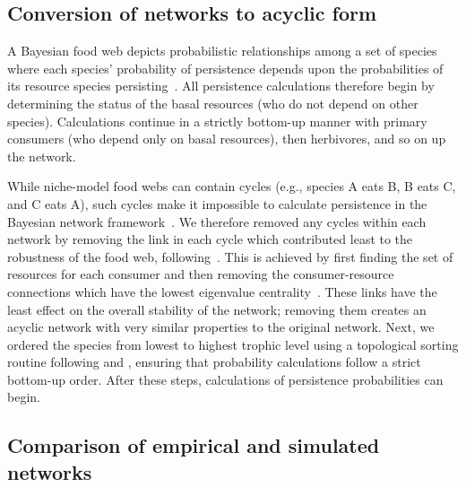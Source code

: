 \documentclass[12pt]{article}
\begin{document}
\begin{spacing}{2.0}
    

    \subsection{Conversion of networks to acyclic form}

        A Bayesian food web depicts probabilistic relationships among a set of species where each species' probability of persistence depends upon the probabilities of its resource species persisting~\citep{Jensen_Nielsen,Eklof2013}. 
        All persistence calculations therefore begin by determining the status of the basal resources (who do not depend on other species).
        Calculations continue in a strictly bottom-up manner with primary consumers (who depend only on basal resources), then herbivores, and so on up the network.

            
        While niche-model food webs can contain cycles (e.g., species A eats B, B eats C, and C eats A), such cycles make it impossible to calculate persistence in the Bayesian network framework~\citep{Tarjan1972}. 
        We therefore removed any cycles within each network by removing the link in each cycle which contributed least to the robustness of the food web, following~\citet{Allesina2009functional}.
        This is achieved by first finding the set of resources for each consumer and then removing the consumer-resource connections which have the lowest eigenvalue centrality~\citep{Allesina2009functional}.
        These links have the least effect on the overall stability of the network; removing them creates an acyclic network with very similar properties to the original network.
        Next, we ordered the species from lowest to highest trophic level using a topological sorting routine following \citet{Tarjan1972} and \citet{Allesinaetal2005}, ensuring that probability calculations follow a strict bottom-up order. 
        After these steps, calculations of persistence probabilities can begin.
        

    \subsection{Comparison of empirical and simulated networks}
    

\end{spacing}
\end{document}
